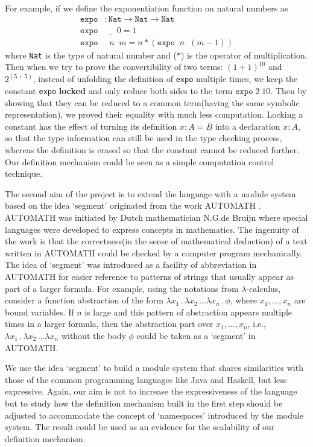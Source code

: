 For example, if we define the exponentiation function on natural numbers as
\begin{align*}
  \texttt{expo} &: \texttt{Nat} \to \texttt{Nat} \to \texttt{Nat} \\
  \texttt{expo} &\;\; \_\;\; 0 = 1 \\
  \texttt{expo} &\;\; n \;\; m = n * (\texttt{expo} \;\; n \;\; (m - 1))
\end{align*}
where \texttt{Nat} is the type of natural number and ($*$) is the operator of multiplication. Then when we try to prove the convertibility of two terms: $(1 + 1)^{10}$ and $2 ^ {(5+5)}$, instead of unfolding the definition of \texttt{expo} multiple times, we keep the constant \texttt{expo} \textbf{locked} and only reduce both sides to the term $\texttt{expo}\;2\;10$. Then by showing that they can be reduced to a common term(having the same symbolic representation), we proved their equality with much less computation. Locking a constant has the effect of turning its definition $x : A = B$ into a declaration $x : A$, so that the type information can still be used in the type checking process, whereas the definition is erased so that the constant cannot be reduced further. Our definition mechanism could be seen as a simple computation control technique.

The second aim of the project is to extend the language with a module system based on the idea `segment' originated from the work AUTOMATH \cite{de1994survey}. AUTOMATH was initiated by Dutch mathematician N.G.de Bruijn where special languages were developed to express concepts in mathematics. The ingenuity of the work is that the correctness(in the sense of mathematical deduction) of a text written in AUTOMATH could be checked by a computer program mechanically. The idea of `segment' was introduced as a facility of abbreviation in AUTOMATH for easier reference to patterns of strings that usually appear as part of a larger formula. For example, using the notations from $\lambda$-calculus, consider a function abstraction of the form $\lambda x_1\,.\,\lambda x_2\,\dots\lambda x_n\,.\,\phi$, where $x_1,\dots,x_n$ are bound variables. If $n$ is large and this pattern of abstraction appears multiple times in a larger formula, then the abstraction part over $x_1,\dots,x_n$, i.e., $\lambda x_1\,.\,\lambda x_2\,\dots\lambda x_n$ without the body $\phi$ could be taken as a `segment' in AUTOMATH.

We use the idea `segment' to build a module system that shares similarities with those of the common programming languages like Java and Haskell, but less expressive. Again, our aim is not to increase the expressiveness of the language but to study how the definition mechanism built in the first step should be adjusted to accommodate the concept of `namespaces' introduced by the module system. The result could be used as an evidence for the scalability of our definition mechanism.

